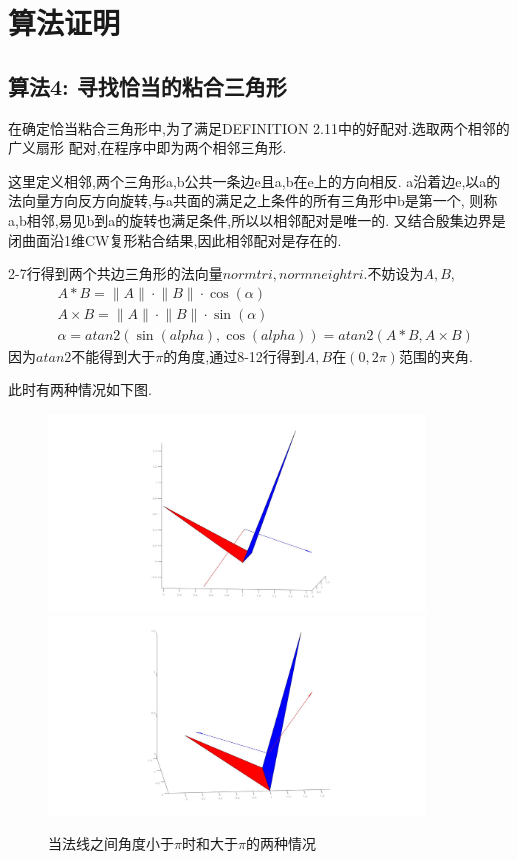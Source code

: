 \documentclass[a4paper]{book}
\numberwithin{equation}{chapter}
\theoremstyle{definition}
\begin{document}
\section{算法证明}
\subsection{算法4: 寻找恰当的粘合三角形}
在确定恰当粘合三角形中,为了满足DEFINITION 2.11中的好配对.选取两个相邻的广义扇形
配对,在程序中即为两个相邻三角形.

这里定义相邻,两个三角形a,b公共一条边e且a,b在e上的方向相反.
a沿着边e,以a的法向量方向反方向旋转,与a共面的满足之上条件的所有三角形中b是第一个,
则称a,b相邻,易见b到a的旋转也满足条件,所以以相邻配对是唯一的.
又结合殷集边界是闭曲面沿1维CW复形粘合结果,因此相邻配对是存在的.

2-7行得到两个共边三角形的法向量$normtri,normneightri$.不妨设为$A,B$,
\begin{align}
	&A * B = \lVert A \rVert \cdot \lVert B \rVert \cdot \cos(\alpha) \\
	&A \times B = \lVert A \rVert \cdot \lVert B \rVert \cdot \sin(\alpha) \\
	&\alpha = atan2(\sin(alpha), \cos(alpha)) = atan2(A * B, A \times B) 
\end{align}
因为$atan2$不能得到大于$\pi$的角度,通过8-12行得到$A,B$在$(0,2\pi)$范围的夹角.

此时有两种情况如下图.
\begin{figure}
	\caption{当法线之间角度小于$\pi$时和大于$\pi$的两种情况}
	\includegraphics[width=10cm]{nearsituation1.jpg}
	\includegraphics[width=10cm]{nearsituation2.jpg}
\end{figure}
\end{document}
